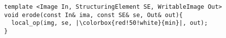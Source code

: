\documentclass[varwidth=12cm, border={0.1cm 0.1cm 0.1cm 0.1cm}]{standalone}
\begin{document}
\begin{verbatim}
  template <Image In, StructuringElement SE, WritableImage Out>
  void erode(const In& ima, const SE& se, Out& out){
    local_op(img, se, |\colorbox{red!50!white}{min}|, out);
  }
\end{verbatim}
\end{document}

